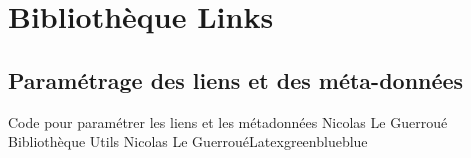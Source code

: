 \chapter{Bibliothèque Links}

\section{Paramétrage des liens et des méta-données}

\begin{Latex}{Code pour paramétrer les liens et les métadonnées}
 {Nicolas Le Guerroué} {Bibliothèque Utils} {Nicolas Le Guerroué}{Latex}{green}{blue}{blue}
    
\end{Latex}
